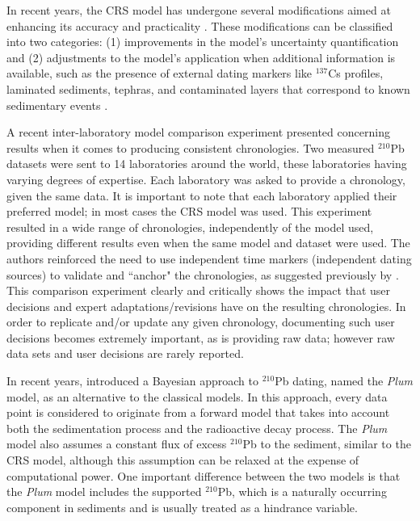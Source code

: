 \documentclass [10pt] {article}
\begin{document}
In recent years, the CRS model has undergone several modifications aimed at enhancing its accuracy and practicality \citep{Binford1990,Appleby2001,Sanchez-Cabeza2014}. These modifications can be classified into two categories: (1) improvements in the model's uncertainty quantification and (2) adjustments to the model's application when additional information is available, such as the presence of external dating markers like $^{137}$Cs profiles, laminated sediments, tephras, and contaminated layers that correspond to known sedimentary events \citep{Appleby1998,Appleby2001,Appleby2008}.


	A recent inter-laboratory model comparison experiment \citep{Barsanti2020} presented concerning results when it comes to producing consistent chronologies.
Two measured $^{210}$Pb datasets were sent to 14 laboratories around the world, these laboratories having varying degrees of expertise.
Each laboratory was asked to provide a chronology, given the same data. 
It is important to note that each laboratory applied their preferred model; in most cases the CRS model was used.
This experiment resulted in a wide range of chronologies, independently of the model used, providing different results even when the same model and dataset were used.
The authors reinforced the need to use independent time markers (independent dating sources) to validate and ``anchor" the chronologies, as suggested previously by \citet{Smith2001}.  
This comparison experiment clearly and critically shows the impact that user decisions and expert adaptations/revisions have on the resulting chronologies.
In order to replicate and/or update any given chronology, documenting such user decisions becomes extremely important, as is providing raw data; however raw data sets and user decisions are rarely reported.

In recent years, \citet{Aquino2018} introduced a Bayesian approach to $^{210}$Pb dating, named the \textit{Plum} model, as an alternative to the classical models. In this approach, every data point is considered to originate from a forward model that takes into account both the sedimentation process and the radioactive decay process. The \textit{Plum} model also assumes a constant flux of excess $^{210}$Pb to the sediment, similar to the CRS model, although this assumption can be relaxed at the expense of computational power. One important difference between the two models is that the \textit{Plum} model includes the supported $^{210}$Pb, which is a naturally occurring component in sediments and is usually treated as a hindrance variable.
\end{document}
